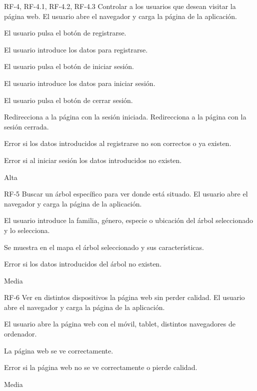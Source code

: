 
{RF-4, RF-4.1, RF-4.2, RF-4.3}
{Controlar a los usuarios que desean visitar la página web.}
{El usuario abre el navegador y carga la página de la aplicación.}
{
	\item El usuario pulsa el botón de registrarse.
	\item El usuario introduce los datos para registrarse.
	\item El usuario pulsa el botón de iniciar sesión.
	\item El usuario introduce los datos para iniciar sesión.
	\item El usuario pulsa el botón de cerrar sesión.
}
{Redirecciona a la página con la sesión iniciada.
 Redirecciona a la página con la sesión cerrada.}
{
	\item Error si los datos introducidos al registrarse no son correctos o ya existen.
	\item Error si al iniciar sesión los datos introducidos no existen.
}
{Alta}

\newpage


{RF-5}
{Buscar un árbol específico para ver donde está situado.}
{El usuario abre el navegador y carga la página de la aplicación.}
{
	\item El usuario introduce la familia, género, especie o ubicación del árbol seleccionado y lo selecciona.
}
{Se muestra en el mapa el árbol seleccionado y sus características.}
{
	\item Error si los datos introducidos del árbol no existen.
}
{Media}

\newpage


{RF-6}
{Ver en distintos dispositivos la página web sin perder calidad.}
{El usuario abre el navegador y carga la página de la aplicación.}
{
	\item El usuario abre la página web con el móvil, tablet, distintos navegadores de ordenador.
}
{La página web se ve correctamente.}
{
	\item Error si la página web no se ve correctamente o pierde calidad.
}
{Media}

\newpage
